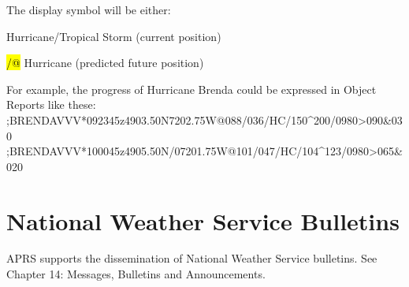 The display symbol will be either:

\begin{description}
\item \hl{\@} Hurricane/Tropical Storm (current position)
\item \hl{/@} Hurricane (predicted future position)
\end{description}





For example, the progress of Hurricane Brenda could be expressed in Object
Reports like these:
;BRENDAVVV*092345z4903.50N\07202.75W@088/036/HC/150^200/0980>090&030%
;BRENDAVVV*100045z4905.50N/07201.75W@101/047/HC/104^123/0980>065&020%


\section {National Weather Service Bulletins}

APRS supports the dissemination of National Weather Service bulletins. See
Chapter 14: Messages, Bulletins and Announcements.




